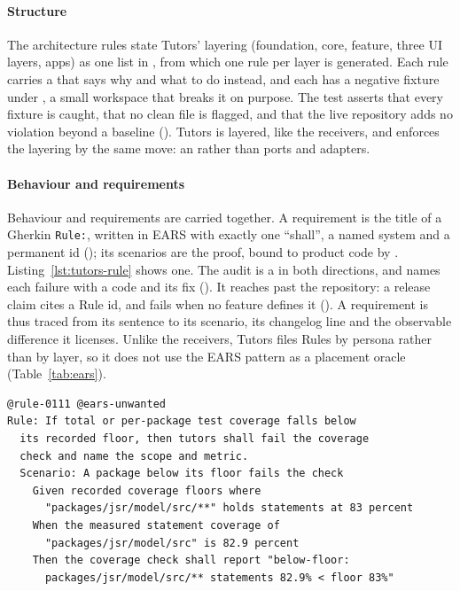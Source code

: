\paragraph{Structure} The architecture rules state Tutors' layering (foundation, core, feature,
three UI layers, apps) as one list in , from which one rule per
layer is generated. Each rule carries a  that says why and what to do instead, and
each has a negative fixture under , a small workspace that
breaks it on purpose. The test asserts that every fixture is caught, that no clean file is
flagged, and that the live repository adds no violation beyond a baseline
(). Tutors is layered, like the receivers, and
enforces the layering by the same move: an  rather than ports and
adapters.

\paragraph{Behaviour and requirements} Behaviour and requirements are carried together. A
requirement is the title of a Gherkin \texttt{Rule:}, written in EARS \citep{mavin2009ears} with
exactly one ``shall'', a named system and a permanent id (); its scenarios are the
proof, bound to product code by . Listing~\ref{lst:tutors-rule} shows one.
The audit is a  in both directions, and names each failure with a code and
its fix (). It reaches past the
repository: a release claim cites a Rule id, and  fails when no
feature defines it (). A requirement is thus traced from
its sentence to its scenario, its changelog line and the observable difference it licenses.
Unlike the receivers, Tutors files Rules by persona rather than by layer, so it does not use the
EARS pattern as a placement oracle (Table~\ref{tab:ears}).

\begin{lstlisting}[caption={An EARS Rule in Tutors, from the test-quality ratchets feature file. The audit checks its form and tag; its scenarios check its truth. Steps are wrapped for width.},label=lst:tutors-rule]
@rule-0111 @ears-unwanted
Rule: If total or per-package test coverage falls below
  its recorded floor, then tutors shall fail the coverage
  check and name the scope and metric.
  Scenario: A package below its floor fails the check
    Given recorded coverage floors where
      "packages/jsr/model/src/**" holds statements at 83 percent
    When the measured statement coverage of
      "packages/jsr/model/src" is 82.9 percent
    Then the coverage check shall report "below-floor:
      packages/jsr/model/src/** statements 82.9% < floor 83%"
\end{lstlisting}

